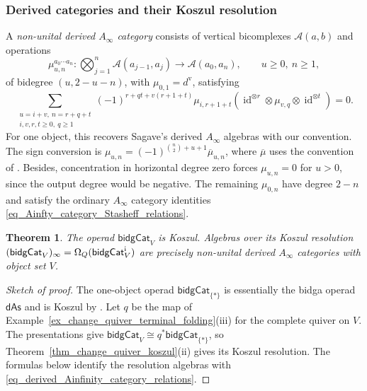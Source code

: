 \documentclass[11pt,letterpaper]{article}
\numberwithin{equation}{section}
\theoremstyle{plain}
\newtheorem{thm}{Theorem}[section]
\theoremstyle{definition}
\theoremstyle{remark}
\newcommand{\antishriek}{%
	\mathord{\mathchoice
		{\rotatebox[origin=c]{180}{$\displaystyle !$}}
		{\rotatebox[origin=c]{180}{$\textstyle !$}}
		{\rotatebox[origin=c]{180}{$\scriptstyle !$}}
		{\rotatebox[origin=c]{180}{$\scriptscriptstyle !$}}}}
\newcommand{\id}{\operatorname{id}}
\begin{document}
\subsubsection{Derived categories and their Koszul resolution}
A \textit{non-unital derived $A_\infty$ category} consists of vertical
bicomplexes $\mathcal A(a,b)$ and operations
\[
 \mu_{u,n}^{a_0\cdots a_n}:
 \bigotimes_{j=1}^{n}\mathcal A(a_{j-1},a_j)
 \longrightarrow\mathcal A(a_0,a_n),
 \qquad u\geq0,\ n\geq1,
\]
of bidegree $(u,2-u-n)$, with $\mu_{0,1}=d^{\mathrm v}$, satisfying
\begin{equation}\label{eq_derived_Ainfinity_category_relations}
 \sum_{\substack{u=i+v,\ n=r+q+t\\i,v,r,t\geq0,\ q\geq1}}
 (-1)^{r+qt+v(r+1+t)}
 \mu_{i,r+1+t}
 (\id^{\otimes r}\otimes\mu_{v,q}\otimes\id^{\otimes t})=0.
\end{equation}
For one object, this recovers Sagave's derived $A_\infty$ algebras
\cite{sagave2007dg} with our convention. The sign conversion
is $\mu_{u,n}=(-1)^{\binom n2+u+1}\overline\mu_{u,n}$, where
$\overline\mu$ uses the convention of
\cite[\S3.1]{Livernet_Roitzheim_Whitehouse_derived_Ainfinity}.
Besides, concentration in horizontal degree zero forces $\mu_{u,n}=0$ for
$u>0$, since the output degree would be negative. The remaining
$\mu_{0,n}$ have degree $2-n$ and satisfy the ordinary $A_\infty$
category identities \eqref{eq_Ainfty_category_Stasheff_relations}.

\begin{thm}\label{thm_bidgCat_resolution_derived_Ainfinity_categories}
The operad $\mathsf{bidgCat}_V$ is Koszul. Algebras over its Koszul
resolution $(\mathsf{bidgCat}_V)_\infty
=\Omega_{Q}(\mathsf{bidgCat}_V^{\antishriek})$ are precisely
non-unital derived $A_\infty$ categories with object set $V$.
\end{thm}
\begin{proof}[Sketch of proof]
The one-object operad $\mathsf{bidgCat}_{\{*\}}$ is essentially the bidga operad $\mathsf{dAs}$ and is Koszul by
\cite[Proposition~3.3]{Livernet_Roitzheim_Whitehouse_derived_Ainfinity}.
Let $q$ be the map of Example~\ref{ex_change_quiver_terminal_folding}(iii)
for the complete quiver on $V$. The presentations give
$\mathsf{bidgCat}_V\cong q^*\mathsf{bidgCat}_{\{*\}}$, so
Theorem~\ref{thm_change_quiver_koszul}(ii) gives its Koszul resolution.
The formulas below identify the resolution algebras with
\eqref{eq_derived_Ainfinity_category_relations}.
\end{proof}
\end{document}
